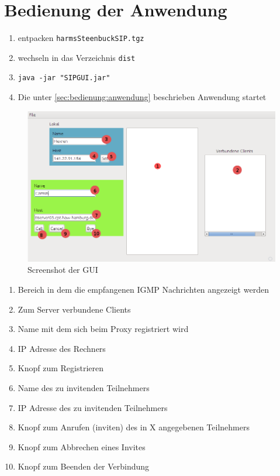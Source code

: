 \documentclass[10pt]{scrartcl}
\begin{document}
\section{Bedienung der Anwendung}
\begin{enumerate}
	\item entpacken \verb!harmsSteenbuckSIP.tgz!
	\item wechseln in das Verzeichnis \verb!dist!
	\item \verb!java -jar "SIPGUI.jar"!
	\item Die unter \ref{sec:bedienung:anwendung} beschrieben Anwendung startet
\end{enumerate}


\label{sec:bedienung:anwendung}		
	\begin{figure}[H]
        \centering
                \includegraphics[width=\textwidth]{img/screenshotApplication}
        \caption{Screenshot der GUI}
        \label{img:gui}
	\end{figure}

\begin{enumerate}
	\item Bereich in dem die empfangenen IGMP Nachrichten angezeigt werden
	\item Zum Server verbundene Clients
	\item Name mit dem sich beim Proxy registriert wird
	\item IP Adresse des Rechners
	\item Knopf zum Registrieren
	\item Name des zu invitenden Teilnehmers
	\item IP Adresse des zu invitenden Teilnehmers
	\item Knopf zum Anrufen (inviten) des in X angegebenen Teilnehmers
	\item Knopf zum Abbrechen eines Invites
	\item Knopf zum Beenden der Verbindung
\end{enumerate}
\end{document}
